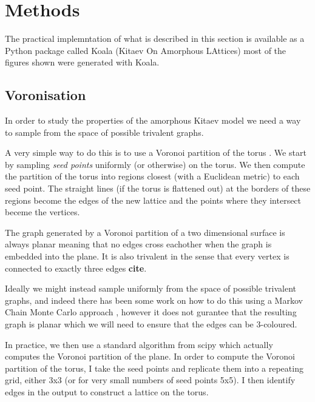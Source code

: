 \begin{Shaded}
\begin{Highlighting}[]
\OperatorTok{\%\%}
\end{Highlighting}
\end{Shaded}

\hypertarget{methods}{%
\section{Methods}\label{methods}}

The practical implemntation of what is described in this section is
available as a Python package called Koala (Kitaev On Amorphous
LAttices) \textcite{tomImperialCMTHKoalaFirst2022} most of the figures
shown were generated with Koala.

\hypertarget{voronisation}{%
\subsection{Voronisation}\label{voronisation}}

In order to study the properties of the amorphous Kitaev model we need a
way to sample from the space of possible trivalent graphs.

A very simple way to do this is to use a Voronoi partition of the torus
\autocite{mitchellAmorphousTopologicalInsulators2018,marsalTopologicalWeaireThorpeModels2020,florescu_designer_2009}.
We start by sampling \emph{seed points} uniformly (or otherwise) on the
torus. We then compute the partition of the torus into regions closest
(with a Euclidean metric) to each seed point. The straight lines (if the
torus is flattened out) at the borders of these regions become the edges
of the new lattice and the points where they intersect beceme the
vertices.

The graph generated by a Voronoi partition of a two dimensional surface
is always planar meaning that no edges cross eachother when the graph is
embedded into the plane. It is also trivalent in the sense that every
vertex is connected to exactly three edges \textbf{cite}.

Ideally we might instead sample uniformly from the space of possible
trivalent graphs, and indeed there has been some work on how to do this
using a Markov Chain Monte Carlo approach
\textcite{alyamiUniformSamplingDirected2016}, however it does not
gurantee that the resulting graph is planar which we will need to ensure
that the edges can be 3-coloured.

In practice, we then use a standard algorithm
\textcite{barberQuickhullAlgorithmConvex1996} from scipy
\textcite{virtanenSciPyFundamentalAlgorithms2020a} which actually
computes the Voronoi partition of the plane. In order to compute the
Voronoi partition of the torus, I take the seed points and replicate
them into a repeating grid, either 3x3 (or for very small numbers of
seed points 5x5). I then identify edges in the output to construct a
lattice on the torus.

